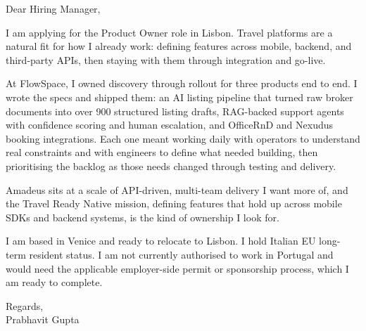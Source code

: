 \documentclass[a4paper,11pt]{article}
\begin{document}
Dear Hiring Manager,

I am applying for the Product Owner role in Lisbon. Travel platforms are a natural fit for how I already work: defining features across mobile, backend, and third-party APIs, then staying with them through integration and go-live.

At FlowSpace, I owned discovery through rollout for three products end to end. I wrote the specs and shipped them: an AI listing pipeline that turned raw broker documents into over 900 structured listing drafts, RAG-backed support agents with confidence scoring and human escalation, and OfficeRnD and Nexudus booking integrations. Each one meant working daily with operators to understand real constraints and with engineers to define what needed building, then prioritising the backlog as those needs changed through testing and delivery.

Amadeus sits at a scale of API-driven, multi-team delivery I want more of, and the Travel Ready Native mission, defining features that hold up across mobile SDKs and backend systems, is the kind of ownership I look for.

I am based in Venice and ready to relocate to Lisbon. I hold Italian EU long-term resident status. I am not currently authorised to work in Portugal and would need the applicable employer-side permit or sponsorship process, which I am ready to complete.

Regards,\\
Prabhavit Gupta
\end{document}
